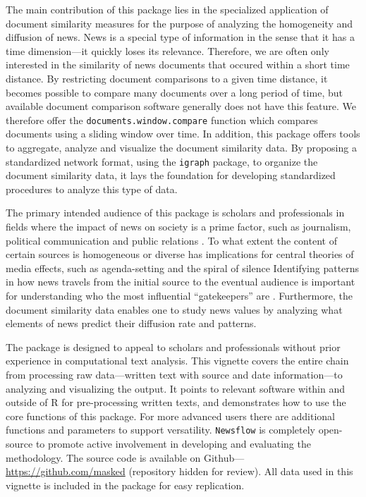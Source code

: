 The main contribution of this package lies in the specialized
application of document similarity measures for the purpose of analyzing
the homogeneity and diffusion of news. News is a special type of
information in the sense that it has a time dimension---it quickly loses
its relevance. Therefore, we are often only interested in the similarity
of news documents that occured within a short time distance. By
restricting document comparisons to a given time distance, it becomes
possible to compare many documents over a long period of time, but
available document comparison software generally does not have this
feature. We therefore offer the \texttt{documents.window.compare}
function which compares documents using a sliding window over time. In
addition, this package offers tools to aggregate, analyze and visualize
the document similarity data. By proposing a standardized network
format, using the \texttt{igraph} package, to organize the document
similarity data, it lays the foundation for developing standardized
procedures to analyze this type of data.

The primary intended audience of this package is scholars and
professionals in fields where the impact of news on society is a prime
factor, such as journalism, political communication and public relations
\citep{baum08, boczkowski07, ragas14}. To what extent the content of
certain sources is homogeneous or diverse has implications for central
theories of media effects, such as agenda-setting and the spiral of
silence \citep{bennett08, blumler99} Identifying patterns in how news
travels from the initial source to the eventual audience is important
for understanding who the most influential ``gatekeepers'' are
\citep{shoemaker09}. Furthermore, the document similarity data enables
one to study news values \citep{galtung65} by analyzing what elements of
news predict their diffusion rate and patterns.

The package is designed to appeal to scholars and professionals without
prior experience in computational text analysis. This vignette covers
the entire chain from processing raw data---written text with source and
date information---to analyzing and visualizing the output. It points to
relevant software within and outside of R for pre-processing written
texts, and demonstrates how to use the core functions of this package.
For more advanced users there are additional functions and parameters to
support versatility. \texttt{Newsflow} is completely open-source to
promote active involvement in developing and evaluating the methodology.
The source code is available on Github---\url{https://github.com/masked}
(repository hidden for review). All data used in this vignette is
included in the package for easy replication.


